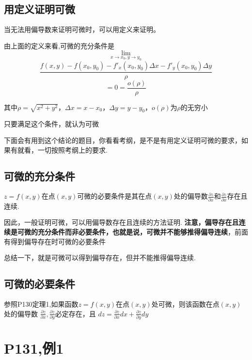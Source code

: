 \documentclass[a4paper]{ctexart}
\begin{document}
\begin{multicols}{2}
\subsection{用定义证明可微}
\par 
当无法用偏导数来证明可微时，可以用定义来证明。
\par
由上面的定义来看,可微的充分条件是
$$
\lim_{x\rightarrow x_0, y\rightarrow y_0}
$$
\begin{equation}
{
    \frac{
        f(x, y) - f(x_0, y_0) - f'_x(x_0,y_0)\Delta x - f'_y(x_0, y_0)\Delta y
    }
    {
        \rho
    }
}
\end{equation}
$$
=0 = \frac{o(\rho)}{\rho}
$$
\par
其中$\rho = \sqrt{x^2+y^2}$，$\Delta x= x - x_0$，$\Delta y = y-y_0$，$o(\rho)$为$\rho$的无穷小
\par
只要满足这个条件，就认为可微
\par 
下面会有用到这个结论的题目，你看看考纲，是不是有用定义证明可微的要求，如果有就看，一切按照考纲上的要求.

\subsection{可微的充分条件}
\par
$z=f(x,y)$在点$(x,y)$可微的必要条件是其在点$(x,y)$处的偏导数$\frac{\partial z}{\partial x}$和$\frac{\partial z}{\partial x}$存在且连续.
\par
因此，一般证明可微，可以用偏导数存在且连续的方法证明.
\textbf{注意，偏导存在且连续是可微的充分条件而非必要条件，也就是说，可微并不能够推得偏导连续}，前面有得到偏导存在时可微的必要条件
\par
总结一下，就是可微可以得到偏导存在，但并不能推得偏导连续.


\subsection{可微的必要条件}
参照P130定理1,如果函数$z=f(x,y)$在点$(x,y)$处可微，则该函数在点$(x,y)$处的偏导数
$\frac{\partial z}{\partial x}, \frac{\partial z}{\partial y}$必定存在，且
$dz =\frac{\partial z}{\partial x}dx + \frac{\partial z}{\partial y}dy$ 



\section{P131,例1}



\end{multicols}
\end{document}
